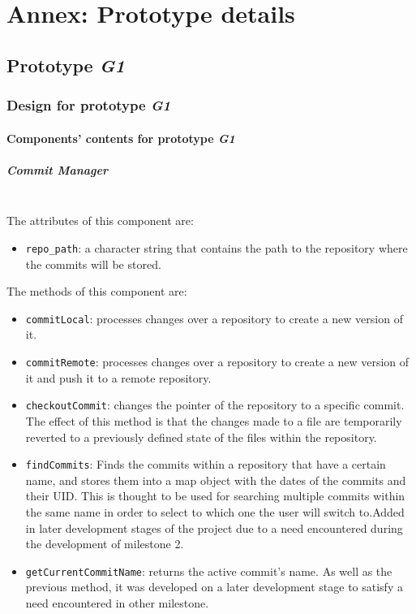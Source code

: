 \chapter{Annex: Prototype details}
\label{cap:Protodet}

\section {Prototype \emph{G1}}

\subsection{Design for prototype \emph{G1}}

\subsubsection{Components' contents for prototype \emph{G1}}
\paragraph{Commit Manager}\mbox{}\\

The attributes of this component are:

\begin{itemize}
    \item \texttt{repo\_path}: a character string that contains the path to the repository where the commits will be stored.
\end{itemize}

The methods of this component are:

\begin{itemize}
    \item \texttt{commitLocal}: processes changes over a repository to create a new version of it.
    \item \texttt{commitRemote}: processes changes over a repository to create a new version of it and push it to a remote repository.
    \item \texttt{checkoutCommit}: changes the pointer of the repository to a specific commit. The effect of this method is that the changes made to a file are temporarily 
    reverted to a previously defined state of the files within the repository. 
    \item \texttt{findCommits}: Finds the commits within a repository that have a certain name, and stores them into a map object with the dates of the commits and their UID.
    This is thought to be used for searching multiple commits within the same name in order to select to which one the user will switch to.Added in later development stages of the project due to a need encountered during the development of milestone 2.
    \item \texttt{getCurrentCommitName}: returns the active commit's name. As well as the previous method, it was developed on a later development stage to satisfy a need encountered in other milestone.
\end{itemize}

